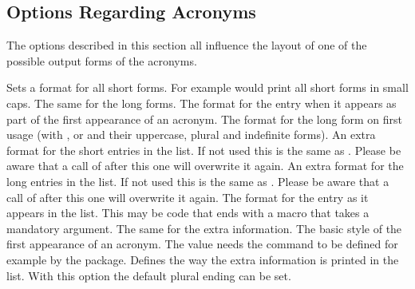 \documentclass[load-preamble+,scrartcl={DIV10}]{cnltx-doc}
\begin{document}
\subsection{Options Regarding Acronyms}
The options described in this section all influence the layout of one of the
possible output forms of the acronyms.
\begin{options}
  \Default
    Sets a format for all short forms. For example
     would print all short forms in small
    caps.
  \Default
    The same for the long forms.
  \Default
    The format for the  entry when it appears as part of the
    first appearance of an acronym.
  \Default
    The format for the long form on first usage (with ,  or
     and their uppercase, plural and indefinite forms).
  \Default
    An extra format for the short entries in the list.  If
    not used this is the same as .  Please be aware that
    a call of  after this one will overwrite it again.
  \Default
    An extra format for the long entries in the list.  If not used this is the
    same as .  Please be aware that a call of
     after this one will overwrite it again.
    \label{key:list-foreign-format}The format for the  entry
    as it appears in the list.  This may be code that ends with a macro that
    takes a mandatory argument.
  \Default
    The same for the extra information.
    The basic style of the first appearance of an
    acronym.  The value  needs the command  to be
    defined for example by the  package.
    Defines the way the extra information is printed in the list.
    With this option the default plural ending can be set.
\end{options}
 
\end{document}
